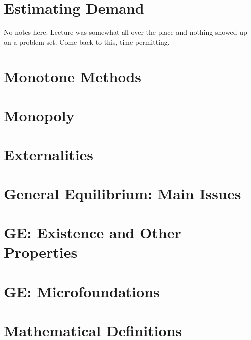 \documentclass{article}
\begin{document}



\newpage

\section{Estimating Demand}
\label{sec:estimating-demand}

No notes here. Lecture was somewhat all over the place and nothing
showed up on a problem set. Come back to this, time permitting.

\section{Monotone Methods}
\label{sec:monotone-methods}



\section{Monopoly}
\label{sec:monopoly}



\section{Externalities}
\label{sec:externalities}



\section{General Equilibrium: Main Issues}
\label{sec:main-issues}



\section{GE: Existence and Other Properties}
\label{sec:exist-other-prop}



\section{GE: Microfoundations}
\label{sec:microfoundations}



\newpage
\appendix
\section{Mathematical Definitions}
\label{sec:math-defin}
\end{document}
